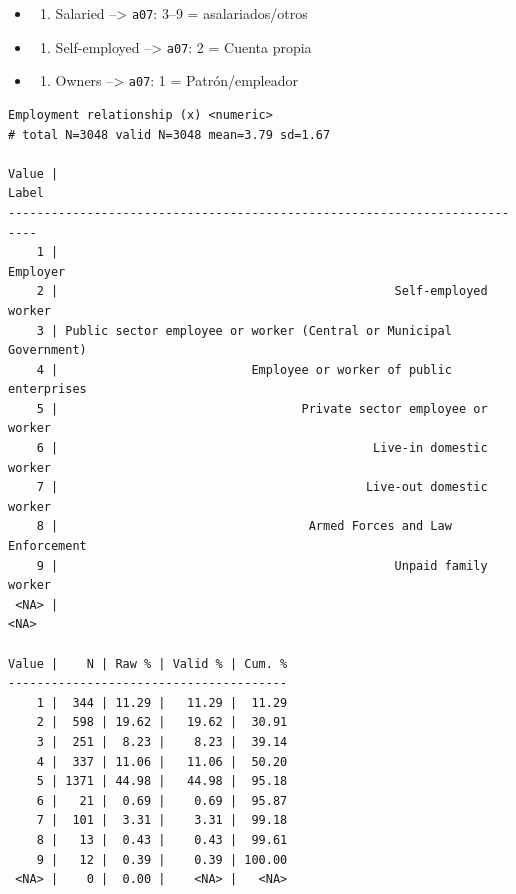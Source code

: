 \documentclass[
  letterpaper,
  DIV=11,
  numbers=noendperiod]{scrreprt}
\newenvironment{Shaded}{\begin{snugshade}}{\end{snugshade}}
\newcommand{\FunctionTok}[1]{\textcolor[rgb]{0.28,0.35,0.67}{#1}}
\newcommand{\NormalTok}[1]{\textcolor[rgb]{0.00,0.23,0.31}{#1}}
\newcommand{\SpecialCharTok}[1]{\textcolor[rgb]{0.37,0.37,0.37}{#1}}
\providecommand{\tightlist}{%
  \setlength{\itemsep}{0pt}\setlength{\parskip}{0pt}}
\begin{document}
\begin{itemize}
\tightlist
\item
  \begin{enumerate}
  \def\labelenumi{\arabic{enumi}.}
  \tightlist
  \item
    Salaried --\textgreater{} \texttt{a07}: 3--9 = asalariados/otros
  \end{enumerate}
\item
  \begin{enumerate}
  \def\labelenumi{\arabic{enumi}.}
  \setcounter{enumi}{1}
  \tightlist
  \item
    Self-employed --\textgreater{} \texttt{a07}: 2 = Cuenta propia
  \end{enumerate}
\item
  \begin{enumerate}
  \def\labelenumi{\arabic{enumi}.}
  \setcounter{enumi}{2}
  \tightlist
  \item
    Owners --\textgreater{} \texttt{a07}: 1 = Patrón/empleador
  \end{enumerate}
\end{itemize}

\begin{Shaded}
\end{Shaded}

\begin{verbatim}
Employment relationship (x) <numeric> 
# total N=3048 valid N=3048 mean=3.79 sd=1.67

Value |                                                              Label
--------------------------------------------------------------------------
    1 |                                                           Employer
    2 |                                               Self-employed worker
    3 | Public sector employee or worker (Central or Municipal Government)
    4 |                           Employee or worker of public enterprises
    5 |                                  Private sector employee or worker
    6 |                                            Live-in domestic worker
    7 |                                           Live-out domestic worker
    8 |                                   Armed Forces and Law Enforcement
    9 |                                               Unpaid family worker
 <NA> |                                                               <NA>

Value |    N | Raw % | Valid % | Cum. %
---------------------------------------
    1 |  344 | 11.29 |   11.29 |  11.29
    2 |  598 | 19.62 |   19.62 |  30.91
    3 |  251 |  8.23 |    8.23 |  39.14
    4 |  337 | 11.06 |   11.06 |  50.20
    5 | 1371 | 44.98 |   44.98 |  95.18
    6 |   21 |  0.69 |    0.69 |  95.87
    7 |  101 |  3.31 |    3.31 |  99.18
    8 |   13 |  0.43 |    0.43 |  99.61
    9 |   12 |  0.39 |    0.39 | 100.00
 <NA> |    0 |  0.00 |    <NA> |   <NA>
\end{verbatim}
\end{document}
